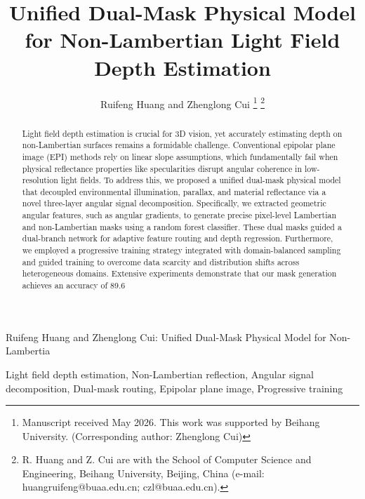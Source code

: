 \documentclass[lettersize,journal]{IEEEtran}
\begin{document}
\title{Unified Dual-Mask Physical Model for Non-Lambertian Light Field Depth Estimation}

\author{Ruifeng Huang and Zhenglong Cui
\thanks{Manuscript received May 2026. This work was supported by Beihang University. (Corresponding author: Zhenglong Cui)}
\thanks{R. Huang and Z. Cui are with the School of Computer Science and Engineering, Beihang University, Beijing, China (e-mail: huangruifeng@buaa.edu.cn; czl@buaa.edu.cn).}}

%
{Ruifeng Huang and Zhenglong Cui: Unified Dual-Mask Physical Model for Non-Lambertia}

\maketitle

\begin{abstract}
Light field depth estimation is crucial for 3D vision, yet accurately estimating depth on non-Lambertian surfaces remains a formidable challenge. Conventional epipolar plane image (EPI) methods rely on linear slope assumptions, which fundamentally fail when physical reflectance properties like specularities disrupt angular coherence in low-resolution light fields. To address this, we proposed a unified dual-mask physical model that decoupled environmental illumination, parallax, and material reflectance via a novel three-layer angular signal decomposition. Specifically, we extracted geometric angular features, such as angular gradients, to generate precise pixel-level Lambertian and non-Lambertian masks using a random forest classifier. These dual masks guided a dual-branch network for adaptive feature routing and depth regression. Furthermore, we employed a progressive training strategy integrated with domain-balanced sampling and guided training to overcome data scarcity and distribution shifts across heterogeneous domains. Extensive experiments demonstrate that our mask generation achieves an accuracy of 89.6%
\end{abstract}

\begin{IEEEkeywords}
Light field depth estimation, Non-Lambertian reflection, Angular signal decomposition, Dual-mask routing, Epipolar plane image, Progressive training
\end{IEEEkeywords}
\end{document}
